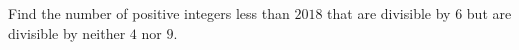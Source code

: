 Find the number of positive integers less than $2018$ that are divisible by $6$ but are divisible by neither $4$ nor $9$.

